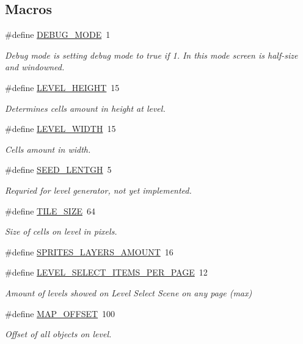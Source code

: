\subsection*{Macros}
\begin{DoxyCompactItemize}
\item 
\#define \hyperlink{group___library_merger_gac80a3592e72fd96b772ee47a7d8e0d0a}{D\+E\+B\+U\+G\+\_\+\+M\+O\+DE}~1
\begin{DoxyCompactList}\small\item\em Debug mode is setting debug mode to true if 1. In this mode screen is half-\/size and windowned. \end{DoxyCompactList}\item 
\#define \hyperlink{group___library_merger_ga16621561d55e77faa59fbfdae692916f}{L\+E\+V\+E\+L\+\_\+\+H\+E\+I\+G\+HT}~15
\begin{DoxyCompactList}\small\item\em Determines cells amount in height at level. \end{DoxyCompactList}\item 
\#define \hyperlink{group___library_merger_ga219cc98394ab36a78470c0627c4f8464}{L\+E\+V\+E\+L\+\_\+\+W\+I\+D\+TH}~15
\begin{DoxyCompactList}\small\item\em Cells amount in width. \end{DoxyCompactList}\item 
\#define \hyperlink{group___library_merger_ga9c1e5774cebc49f1e8f2e12d7ead3964}{S\+E\+E\+D\+\_\+\+L\+E\+N\+T\+GH}~5
\begin{DoxyCompactList}\small\item\em Requried for level generator, not yet implemented. \end{DoxyCompactList}\item 
\#define \hyperlink{group___library_merger_ga62ecd70800687eb2d625af180c4210d7}{T\+I\+L\+E\+\_\+\+S\+I\+ZE}~64
\begin{DoxyCompactList}\small\item\em Size of cells on level in pixels. \end{DoxyCompactList}\item 
\#define \hyperlink{group___library_merger_ga365d4edfeeccdeb15f10a661762c7638}{S\+P\+R\+I\+T\+E\+S\+\_\+\+L\+A\+Y\+E\+R\+S\+\_\+\+A\+M\+O\+U\+NT}~16
\item 
\#define \hyperlink{group___library_merger_ga9c8eceb33583592db0673d5c43620a35}{L\+E\+V\+E\+L\+\_\+\+S\+E\+L\+E\+C\+T\+\_\+\+I\+T\+E\+M\+S\+\_\+\+P\+E\+R\+\_\+\+P\+A\+GE}~12
\begin{DoxyCompactList}\small\item\em Amount of levels showed on Level Select Scene on any page (max) \end{DoxyCompactList}\item 
\#define \hyperlink{group___library_merger_ga6012442435a7f8303b0ed3c7152d52ea}{M\+A\+P\+\_\+\+O\+F\+F\+S\+ET}~100
\begin{DoxyCompactList}\small\item\em Offset of all objects on level. \end{DoxyCompactList}\end{DoxyCompactItemize}
